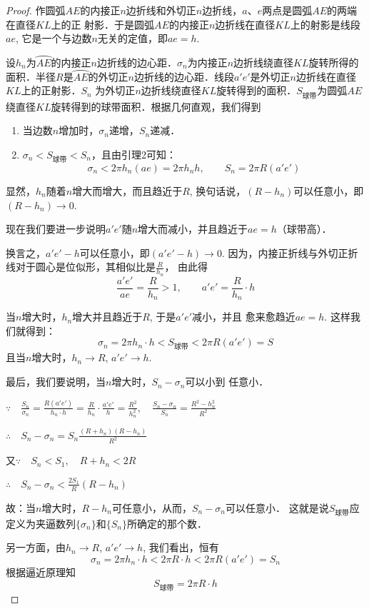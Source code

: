 \begin{proof}
作圆弧$AE$的内接正$n$边折线和外切正$n$边折线，$a$、$e$两点是圆弧$AE$的两端在直径$KL$上的正
射影．于是圆弧$AE$的内接正$n$边折线在直径$KL$上的射影是线段$ae$, 它是一个与边数$n$无关的定值，即$ae=h$.

设$h_n$为$\wideparen{AE}$的内接正$n$边折线的边心距．$\sigma_n$为内接正$n$边折线绕直径$KL$旋转所得的面积．半径$R$是$\wideparen{AE}$的外切正$n$边折线的边心距．线段$a'e'$是外切正$n$边折线在直径$KL$上的正射影．$S_n$ 为外切正$n$边折线绕直径$KL$旋转得到的面积．$S_{\text{球带}}$为圆弧$AE$绕直径$KL$旋转得到的球带面积．根据几何直观，我们得到
\begin{enumerate}
\item 当边数$n$增加时，$\sigma_n$递增，$S_n$递减．
\item $\sigma_n<S_{\text{球带}}<S_n$，且由引理2可知：
\[\sigma_n<2\pi h_n(ae)=2\pi h_n h,\qquad S_n =2\pi R (a'e')\]    
\end{enumerate}

显然，$h_n$随着$n$增大而增大，而且趋近于$R$, 换句话说，$(R-h_n)$可以任意小，即$(R-h_n)\to 0$. 

现在我们要进一步说明$a'e'$随$n$增大而减小，并且趋近于$ae=h$（球带高）．

换言之，$a'e'-h$可以任意小，即$(a'e'-h)\to 0$. 因为，内接正折线与外切正折线对于圆心是位似形，其相似比是$\frac{R}{h_n}$，
由此得
\[\frac{a'e'}{ae}=\frac{R}{h_n}>1,\qquad a'e'=\frac{R}{h_n}\cdot h\]

当$n$增大时，$h_n$增大并且趋近于$R$, 于是$a'e'$减小，并且
愈来愈趋近$ae=h$. 这样我们就得到：
\[\sigma_n=2\pi h_n\cdot h<S_{\text{球带}}<2\pi R(a'e')=S\]
且当$n$增大时，$h_n\to R$, $a'e'\to h$.

最后，我们要说明，当$n$增大时，$S_n-\sigma_n$可以小到
任意小．

$\because\quad \frac{S_n}{\sigma_n}=\frac{R(a'e')}{h_n\cdot h}=\frac{R}{h_n}\cdot \frac{a'e'}{h}=\frac{R^2}{h^2_n},\quad \frac{S_n-\sigma_n}{S_n}=\frac{R^2-h^2_n}{R^2}$

$\therefore\quad S_n-\sigma_n=S_n\frac{(R+h_n) (R-h_n)}{R^2}$

又$\because\quad S_n<S_1,\quad R+h_n<2R$

$\therefore\quad S_n-\sigma_n<\frac{2S_1}{R}(R-h_n)$

故：当$n$增大时，$R-h_n$可任意小，从而，$S_n -\sigma_n$可以任意小．
这就是说$S_{\text{球带}}$应定义为夹逼数列$\{\sigma_n\}$和$\{S_n \}$所确定的那个数．

另一方面，由$h_n\to R$, $a'e'\to h$, 我们看出，恒有
\[\sigma_n=2\pi h_n\cdot h<2\pi R\cdot h<2\pi R (a'e') =S_n\]
根据逼近原理知
$$S_{\text{球带}}=2\pi R\cdot h$$
\end{proof}

